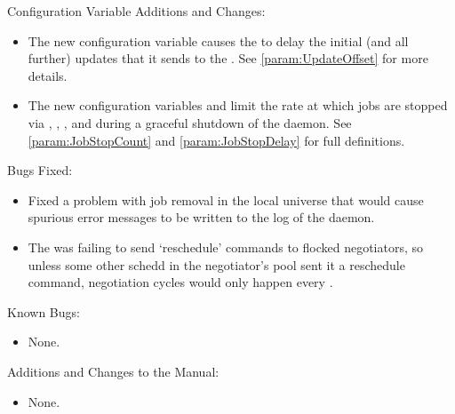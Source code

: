 \noindent Configuration Variable Additions and Changes:

\begin{itemize}

\item The new configuration variable  
  causes the  to
  delay the initial (and all further) updates that it sends to the
  .  See \ref{param:UpdateOffset} for more details.

\item The new configuration variables
   and 
  limit the rate at which jobs are stopped via ,
  , , and during a graceful shutdown of
  the  daemon.
  See \ref{param:JobStopCount} and \ref{param:JobStopDelay} 
  for full definitions.

\end{itemize}

\noindent Bugs Fixed:

\begin{itemize}

\item Fixed a problem with job removal in the local universe that 
  would cause spurious error messages to be written to the log of the
   daemon.

\item The  was failing to send `reschedule' commands to
flocked negotiators, so unless some other schedd in the negotiator's
pool sent it a reschedule command, negotiation cycles would only
happen every .

\end{itemize}

\noindent Known Bugs:

\begin{itemize}

\item None.

\end{itemize}

\noindent Additions and Changes to the Manual:

\begin{itemize}

\item None.

\end{itemize}

